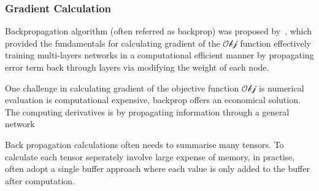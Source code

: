\subsubsection{Gradient Calculation}
Backpropagation algorithm (often referred as backprop) was proposed by~\citet{werbos1975beyond}, which provided the fundamentals for calculating gradient of the $\mathcal{Obj}$ function effectively  training multi-layers networks in a computational efficient manner by propagating error term back through layers via modifying the weight of each node. 
\par
One challenge in calculating gradient of the objective function $\mathcal{Obj}$ is numerical evaluation is computational expensive, backprop offers an economical solution. The computing derivatives is by propagating information through a general network 
\par 
Back propagation calculations often needs to summarise many tensors. To calculate each tensor seperately involve large expense of memory, in practise, often adopt a single buffer approach where each value is only added to the buffer after computation.